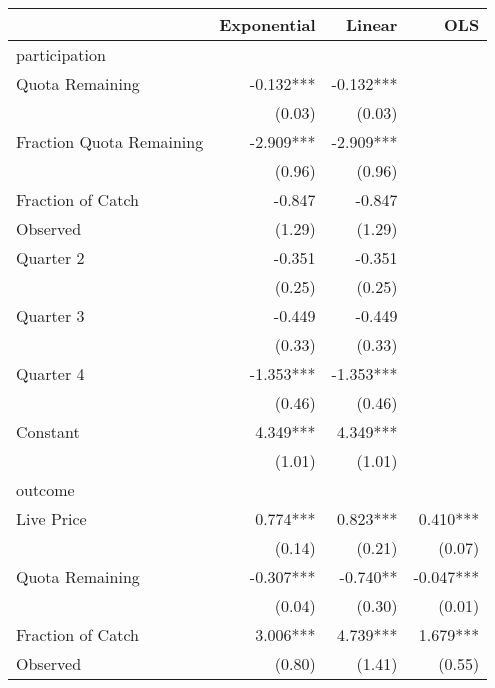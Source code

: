 {
\def\sym#1{\ifmmode^{#1}\else\(^{#1}\)\fi}
\begin{tabular}{l*{3}{r}}
\hline\hline
                    & Exponential   &      Linear   &         OLS   \\
\hline
participation       &               &               &               \\
Quota Remaining     &      -0.132***&      -0.132***&               \\
                    &      (0.03)   &      (0.03)   &               \\
Fraction Quota Remaining&      -2.909***&      -2.909***&               \\
                    &      (0.96)   &      (0.96)   &               \\
Fraction of Catch   &      -0.847   &      -0.847   &               \\
Observed            &      (1.29)   &      (1.29)   &               \\
Quarter 2           &      -0.351   &      -0.351   &               \\
                    &      (0.25)   &      (0.25)   &               \\
Quarter 3           &      -0.449   &      -0.449   &               \\
                    &      (0.33)   &      (0.33)   &               \\
Quarter 4           &      -1.353***&      -1.353***&               \\
                    &      (0.46)   &      (0.46)   &               \\
Constant               &       4.349***&       4.349***&               \\
                    &      (1.01)   &      (1.01)   &               \\
\hline
outcome             &               &               &               \\
Live Price          &       0.774***&       0.823***&       0.410***\\
                    &      (0.14)   &      (0.21)   &      (0.07)   \\
Quota Remaining     &      -0.307***&      -0.740** &      -0.047***\\
                    &      (0.04)   &      (0.30)   &      (0.01)   \\
Fraction of Catch   &       3.006***&       4.739***&       1.679***\\
Observed            &      (0.80)   &      (1.41)   &      (0.55)   \\

\end{tabular}}
